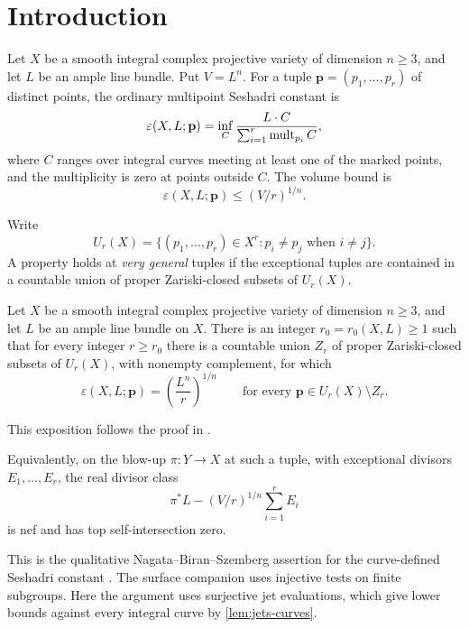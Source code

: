 \section{Introduction}\label{sec:introduction}

Let $X$ be a smooth integral complex projective variety of dimension $n\ge3$, and let $L$ be an ample line bundle. Put $V=L^n$. For a tuple $\mathbf{p}=(p_1,\ldots,p_r)$ of distinct points, the ordinary multipoint Seshadri constant is
\begin{equation}\label{eq:seshadri-definition}
 \varepsilon(X,L;\mathbf{p})
 =\inf_C\frac{L\cdot C}{\sum_{i=1}^r\operatorname{mult}_{p_i}C},
\end{equation}
where $C$ ranges over integral curves meeting at least one of the marked points, and the multiplicity is zero at points outside $C$. The volume bound is
\begin{equation}\label{eq:volume-bound}
 \varepsilon(X,L;\mathbf{p})\le (V/r)^{1/n}.
\end{equation}


Write
\[
 U_r(X)=\{(p_1,\ldots,p_r)\in X^r:p_i\ne p_j\text{ when }i\ne j\}.
\]
A property holds at \emph{very general} tuples if the exceptional tuples are contained in a countable union of proper Zariski-closed subsets of $U_r(X)$.

\begin{maintheorem}\label{thm:main}
Let $X$ be a smooth integral complex projective variety of dimension $n\ge3$, and let $L$ be an ample line bundle on $X$. There is an integer $r_0=r_0(X,L)\ge1$ such that for every integer $r\ge r_0$ there is a countable union $Z_r$ of proper Zariski-closed subsets of $U_r(X)$, with nonempty complement, for which
\[
 \varepsilon(X,L;\mathbf{p})=\left(\frac{L^n}{r}\right)^{1/n}
 \qquad\text{for every }\mathbf{p}\in U_r(X)\setminus Z_r.
\]
\end{maintheorem}

This exposition follows the proof in \cite{OpenAIMathSource}.

Equivalently, on the blow-up $\pi:Y\to X$ at such a tuple, with exceptional divisors $E_1,\ldots,E_r$, the real divisor class
\[
 \pi^*L-(V/r)^{1/n}\sum_{i=1}^rE_i
\]
is nef and has top self-intersection zero.


This is the qualitative Nagata--Biran--Szemberg assertion for the curve-defined Seshadri constant \cite[Conjecture~1.3 and Remark~1.4]{RoeRoss2009}. The surface companion \cite{OpenAI2026Surfaces} uses injective tests on finite subgroups. Here the argument uses surjective jet evaluations, which give lower bounds against every integral curve by \cref{lem:jets-curves}.


